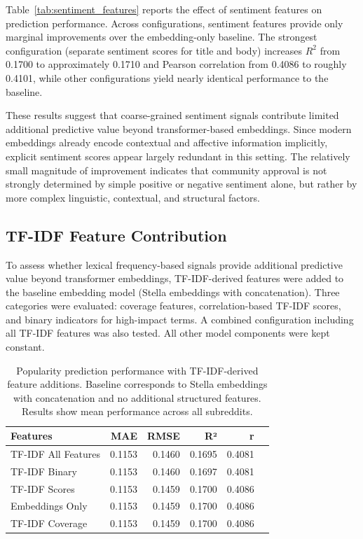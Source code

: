 Table~\ref{tab:sentiment_features} reports the effect of sentiment features on prediction performance. Across configurations, sentiment features provide only marginal improvements over the embedding-only baseline. The strongest configuration (separate sentiment scores for title and body) increases $R^2$ from 0.1700 to approximately 0.1710 and Pearson correlation from 0.4086 to roughly 0.4101, while other configurations yield nearly identical performance to the baseline.

These results suggest that coarse-grained sentiment signals contribute limited additional predictive value beyond transformer-based embeddings. Since modern embeddings already encode contextual and affective information implicitly, explicit sentiment scores appear largely redundant in this setting. The relatively small magnitude of improvement indicates that community approval is not strongly determined by simple positive or negative sentiment alone, but rather by more complex linguistic, contextual, and structural factors.

\subsection{TF-IDF Feature Contribution}

To assess whether lexical frequency-based signals provide additional predictive value beyond transformer embeddings, TF-IDF-derived features were added to the baseline embedding model (Stella embeddings with concatenation).
Three categories were evaluated: coverage features, correlation-based TF-IDF scores, and binary indicators for high-impact terms. A combined configuration including all TF-IDF features was also tested. All other model components were kept constant.

\begin{table}[htbp]
\centering
\caption{Popularity prediction performance with TF-IDF-derived feature additions. Baseline corresponds to Stella embeddings with concatenation and no additional structured features. Results show mean performance across all subreddits.}
\label{tab:tfidf_features}
\begin{tabular}{lrrrrr}
\toprule
Features & MAE & RMSE & R² & r \\
\midrule
TF-IDF All Features & 0.1153 & 0.1460 & 0.1695 & 0.4081 \\
TF-IDF Binary & 0.1153 & 0.1460 & 0.1697 & 0.4081 \\
TF-IDF Scores & 0.1153 & 0.1459 & 0.1700 & 0.4086 \\
Embeddings Only & 0.1153 & 0.1459 & 0.1700 & 0.4086 \\
TF-IDF Coverage & 0.1153 & 0.1459 & 0.1700 & 0.4086 \\
\bottomrule
\end{tabular}
\end{table}

